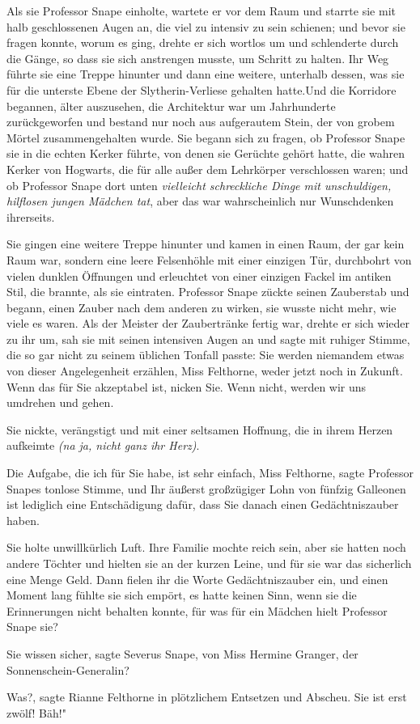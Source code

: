 Als sie Professor Snape einholte, wartete er vor dem Raum und starrte sie mit
halb geschlossenen Augen an, die viel zu intensiv zu sein schienen; und bevor
sie fragen konnte, worum es ging, drehte er sich wortlos um und schlenderte
durch die Gänge, so dass sie sich anstrengen musste, um Schritt zu halten. Ihr
Weg führte sie eine Treppe hinunter und dann eine weitere, unterhalb dessen, was
sie für die unterste Ebene der Slytherin-Verliese gehalten hatte.Und die
Korridore begannen, älter auszusehen, die Architektur war um Jahrhunderte
zurückgeworfen und bestand nur noch aus aufgerautem Stein, der von grobem Mörtel
zusammengehalten wurde. Sie begann sich zu fragen, ob Professor Snape sie in die
echten Kerker führte, von denen sie Gerüchte gehört hatte, die wahren Kerker von
Hogwarts, die für alle außer dem Lehrkörper verschlossen waren; und ob Professor
Snape dort unten\emph{ vielleicht schreckliche Dinge mit unschuldigen, hilflosen
jungen Mädchen tat}, aber das war wahrscheinlich nur Wunschdenken ihrerseits.

Sie gingen eine weitere Treppe hinunter und kamen in einen Raum, der gar kein
Raum war, sondern eine leere Felsenhöhle mit einer einzigen Tür, durchbohrt von
vielen dunklen Öffnungen und erleuchtet von einer einzigen Fackel im antiken
Stil, die brannte, als sie eintraten. Professor Snape zückte seinen Zauberstab
und begann, einen Zauber nach dem anderen zu wirken, sie wusste nicht mehr, wie
viele es waren. Als der Meister der Zaubertränke fertig war, drehte er sich
wieder zu ihr um, sah sie mit seinen intensiven Augen an und sagte mit ruhiger
Stimme, die so gar nicht zu seinem üblichen Tonfall passte: \glqq{}Sie werden
niemandem etwas von dieser Angelegenheit erzählen, Miss Felthorne, weder jetzt
noch in Zukunft. Wenn das für Sie akzeptabel ist, nicken Sie. Wenn nicht, werden
wir uns umdrehen und gehen.\grqq{}

Sie nickte, verängstigt und mit einer seltsamen Hoffnung, die in ihrem Herzen
aufkeimte \emph{(na ja, nicht ganz ihr Herz)}.

\glqq{}Die Aufgabe, die ich für Sie habe, ist sehr einfach, Miss
Felthorne\grqq{}, sagte Professor Snapes tonlose Stimme, \glqq{}und Ihr äußerst
großzügiger Lohn von fünfzig Galleonen ist lediglich eine Entschädigung dafür,
dass Sie danach einen Gedächtniszauber haben.\grqq{}

Sie holte unwillkürlich Luft. Ihre Familie mochte reich sein, aber sie hatten
noch andere Töchter und hielten sie an der kurzen Leine, und für sie war das
sicherlich eine Menge Geld. Dann fielen ihr die Worte Gedächtniszauber ein, und
einen Moment lang fühlte sie sich empört, es hatte keinen Sinn, wenn sie die
Erinnerungen nicht behalten konnte, für was für ein Mädchen hielt Professor
Snape sie?

\glqq{}Sie wissen sicher\grqq{}, sagte Severus Snape, \glqq{}von Miss Hermine
Granger, der Sonnenschein-Generalin?\grqq{}

\glqq{}Was?\grqq{}, sagte Rianne Felthorne in plötzlichem Entsetzen und Abscheu.
\glqq{}Sie ist erst zwölf! Bäh!"

